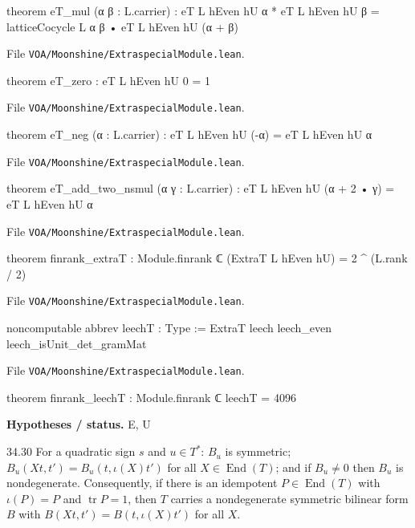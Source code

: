 \documentclass[11pt,openany]{book}
\newcommand{\leanpath}[1]{\texttt{\small #1}}
\theoremstyle{definition}
\theoremstyle{plain}
\newcommand{\End}{\operatorname{End}}
\newcommand{\tr}{\operatorname{tr}}
\begin{document}
\begin{leancode}
theorem eT_mul (α β : L.carrier) :
    eT L hEven hU α * eT L hEven hU β = latticeCocycle L α β • eT L hEven hU (α + β)
\end{leancode}
{\raggedright\noindent File \leanpath{VOA/\allowbreak Moonshine/\allowbreak ExtraspecialModule.lean}.\par}
\begin{leancode}
theorem eT_zero : eT L hEven hU 0 = 1
\end{leancode}
{\raggedright\noindent File \leanpath{VOA/\allowbreak Moonshine/\allowbreak ExtraspecialModule.lean}.\par}
\begin{leancode}
theorem eT_neg (α : L.carrier) : eT L hEven hU (-α) = eT L hEven hU α
\end{leancode}
{\raggedright\noindent File \leanpath{VOA/\allowbreak Moonshine/\allowbreak ExtraspecialModule.lean}.\par}
\begin{leancode}
theorem eT_add_two_nsmul (α γ : L.carrier) : eT L hEven hU (α + 2 • γ) = eT L hEven hU α
\end{leancode}
{\raggedright\noindent File \leanpath{VOA/\allowbreak Moonshine/\allowbreak ExtraspecialModule.lean}.\par}
\begin{leancode}
theorem finrank_extraT : Module.finrank ℂ (ExtraT L hEven hU) = 2 ^ (L.rank / 2)
\end{leancode}
{\raggedright\noindent File \leanpath{VOA/\allowbreak Moonshine/\allowbreak ExtraspecialModule.lean}.\par}
\begin{leancode}
noncomputable abbrev leechT : Type := ExtraT leech leech_even leech_isUnit_det_gramMat
\end{leancode}
{\raggedright\noindent File \leanpath{VOA/\allowbreak Moonshine/\allowbreak ExtraspecialModule.lean}.\par}
\begin{leancode}
theorem finrank_leechT : Module.finrank ℂ leechT = 4096
\end{leancode}
\noindent\textbf{Hypotheses / status.} E, U\par
\medskip
\begin{btheorem}{34.30}
For a quadratic sign $s$ and $u\in T^*$: $B_u$ is symmetric; $B_u(Xt,t')=B_u(t,\iota(X)t')$ for all
$X\in\End(T)$; and if $B_u\ne0$ then $B_u$ is nondegenerate.  Consequently, if there is an
idempotent $P\in\End(T)$ with $\iota(P)=P$ and $\tr P=1$, then $T$ carries a nondegenerate symmetric
bilinear form $B$ with $B(Xt,t')=B(t,\iota(X)t')$ for all $X$.
\end{btheorem}
\end{document}
